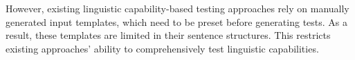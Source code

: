  However, existing linguistic capability-based testing approaches rely on manually generated input templates, which need to be preset before generating tests. 
 As a result, these templates are limited in their sentence
structures. This restricts existing approaches' ability to comprehensively test linguistic capabilities. 
  






